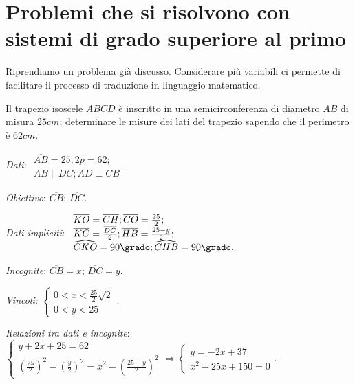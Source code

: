 
\section{Problemi che si risolvono con sistemi di grado superiore al primo}
Riprendiamo un problema già discusso. Considerare più variabili ci permette di facilitare il processo di traduzione in linguaggio matematico.

\begin{problema}
Il trapezio isoscele ${ABCD}$ è inscritto in una semicirconferenza di diametro ${AB}$ di misura $25\unit{cm}$; determinare le misure dei lati del trapezio sapendo che il perimetro è $62\unit{cm}$.
\end{problema}
\begin{multicols}{2}
\emph{Dati}: $\begin{array}{l}\overline{AB}=25;2p=62;\\{AB}\parallel {DC};{AD}\equiv {CB}\end{array}$.

\emph{Obiettivo}: $\overline{CB}$; $\overline{DC}$.

\emph{Dati impliciti}: $\begin{array}{l}
\overline{{KO}}=\overline{{CH}}; \overline{{CO}}=\frac{25} 2;\\ \overline{{KC}}=\frac{\overline{{DC}}} 2; \overline{{HB}}=\frac{25-y} 2;\\ \widehat {{CKO}}=90\grado; \widehat {{CHB}}=90\grado.\end{array}$

\emph{Incognite}: $\overline{{CB}}=x$; $\overline{{DC}}=y$.

\emph{Vincoli: } $\left\{\begin{array}{l}0<x<\frac{25} 2\sqrt 2\\0<y<25 \end{array}\right.$.
\begin{center}

\end{center}
\end{multicols}

\emph{Relazioni tra dati e incognite}:
$ \left\{\begin{array}{l}{y+2x+25=62}\\{\left(\frac{25} 2\right)^2-\left(\frac y 2\right)^2=x^2-\left(\frac{25-y} 2\right)^2}\end{array}\right. \Rightarrow \left\{\begin{array}{l}{y=-2x+37}\\{x^2-25x+150=0}\end{array}\right.. $

